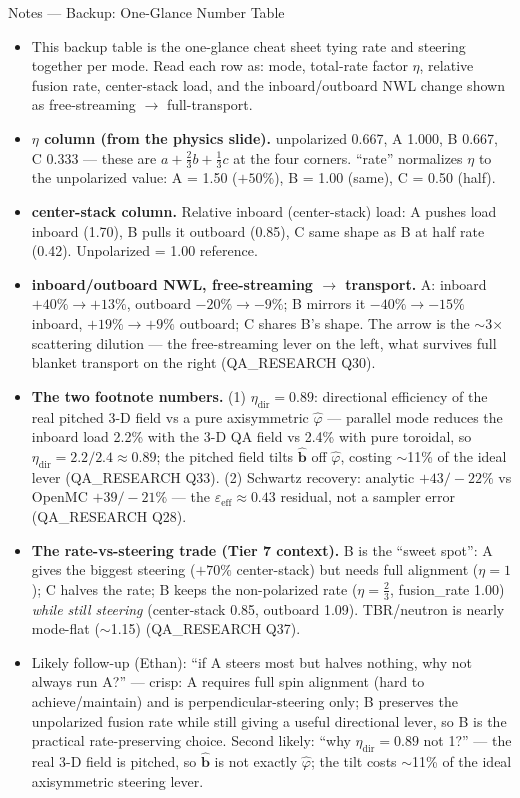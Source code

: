 \documentclass[11pt,aspectratio=169]{beamer}
\newcommand{\bhat}{\hat{\mathbf{b}}}
\begin{document}
\begin{frame}[allowframebreaks]{Notes --- Backup: One-Glance Number Table}
{\color{red}\footnotesize
\begin{itemize}
\item This backup table is the one-glance cheat sheet tying rate and steering together per mode. Read
      each row as: mode, total-rate factor $\eta$, relative fusion rate, center-stack load, and the
      inboard/outboard NWL change shown as free-streaming $\to$ full-transport.
\item \textbf{$\eta$ column (from the physics slide).} unpolarized 0.667, A 1.000, B 0.667, C 0.333 ---
      these are $a+\tfrac23 b+\tfrac13 c$ at the four corners. ``rate'' normalizes $\eta$ to the
      unpolarized value: A = 1.50 ($+50\%$), B = 1.00 (same), C = 0.50 (half).
\item \textbf{center-stack column.} Relative inboard (center-stack) load: A pushes load inboard (1.70),
      B pulls it outboard (0.85), C same shape as B at half rate (0.42). Unpolarized = 1.00 reference.
\item \textbf{inboard/outboard NWL, free-streaming $\to$ transport.} A: inboard $+40\%\to+13\%$,
      outboard $-20\%\to-9\%$; B mirrors it $-40\%\to-15\%$ inboard, $+19\%\to+9\%$ outboard; C shares
      B's shape. The arrow is the $\sim$3$\times$ scattering dilution --- the free-streaming lever on
      the left, what survives full blanket transport on the right (QA\_RESEARCH Q30).
\item \textbf{The two footnote numbers.} (1) $\eta_\text{dir}=0.89$: directional efficiency of the real
      pitched 3-D field vs a pure axisymmetric $\hat\varphi$ --- parallel mode reduces the inboard load
      2.2\% with the 3-D QA field vs 2.4\% with pure toroidal, so $\eta_\text{dir}=2.2/2.4\approx0.89$;
      the pitched field tilts $\bhat$ off $\hat\varphi$, costing $\sim$11\% of the ideal lever
      (QA\_RESEARCH Q33). (2) Schwartz recovery: analytic $+43/-22\%$ vs OpenMC $+39/-21\%$ --- the
      $\varepsilon_\text{eff}\approx0.43$ residual, not a sampler error (QA\_RESEARCH Q28).
\item \textbf{The rate-vs-steering trade (Tier 7 context).} B is the ``sweet spot'': A gives the biggest
      steering ($+70\%$ center-stack) but needs full alignment ($\eta=1$); C halves the rate; B keeps the
      non-polarized rate ($\eta=\tfrac23$, fusion\_rate 1.00) \emph{while still steering} (center-stack
      0.85, outboard 1.09). TBR/neutron is nearly mode-flat ($\sim$1.15) (QA\_RESEARCH Q37).
\item Likely follow-up (Ethan): ``if A steers most but halves nothing, why not always run A?'' --- crisp:
      A requires full spin alignment (hard to achieve/maintain) and is perpendicular-steering only; B
      preserves the unpolarized fusion rate while still giving a useful directional lever, so B is the
      practical rate-preserving choice. Second likely: ``why $\eta_\text{dir}=0.89$ not 1?'' --- the real
      3-D field is pitched, so $\bhat$ is not exactly $\hat\varphi$; the tilt costs $\sim$11\% of the
      ideal axisymmetric steering lever.
\end{itemize}
}
\end{frame}
\end{document}
